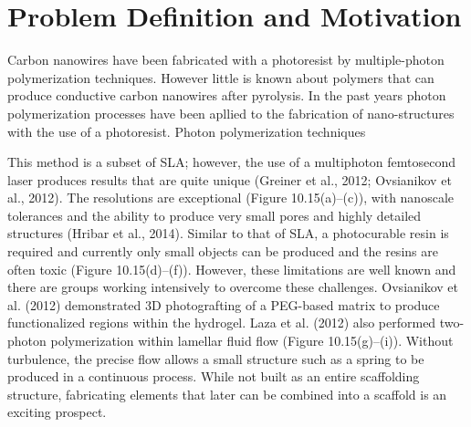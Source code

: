 
\chapter{Problem Definition and Motivation} %

\label{Chapter:ProblemDefinitionandMotivation}


Carbon nanowires have been fabricated with a photoresist by multiple-photon polymerization techniques. However little is known about polymers that can produce conductive carbon nanowires after pyrolysis. In the past years photon polymerization processes have been apllied to the fabrication of nano-structures with the use of a photoresist. \cite{Boer2014} Photon polymerization techniques 


This method is a subset of SLA; however, the use of a multiphoton femtosecond laser produces results that are quite unique (Greiner et al., 2012; Ovsianikov et al., 2012). The resolutions are exceptional (Figure 10.15(a)–(c)), with nanoscale tolerances and the ability to produce very small pores and highly detailed structures (Hribar et al., 2014). Similar to that of SLA, a photocurable resin is required and currently only small objects can be produced and the resins are often toxic (Figure 10.15(d)–(f)). However, these limitations are well known and there are groups working intensively to overcome these challenges. Ovsianikov et al. (2012) demonstrated 3D photografting of a PEG-based matrix to produce functionalized regions within the hydrogel. Laza et al. (2012) also performed two-photon polymerization within lamellar fluid flow (Figure 10.15(g)–(i)). Without turbulence, the precise flow allows a small structure such as a spring to be produced in a continuous process. While not built as an entire scaffolding structure, fabricating elements that later can be combined into a scaffold is an exciting prospect.







